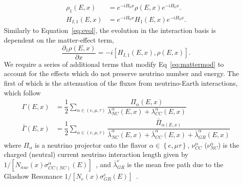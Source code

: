 \documentclass[main.tex]{subfiles}
\begin{document}
\begin{align}
    \rho_{1}(E,x) &= e^{-i H_{0}x}\rho(E,x) e^{-iH_{0}x}. \\
    H_{I,1}(E,x)&= e^{-i H_{0}x} H_{1}(E,x) e^{-iH_{0}x}.
\end{align}
Similarly to Equation~\eqref{eq:evol}, the evolution in the interaction basis is dependent on the matter-effect term,
\begin{equation}\label{eq:mattermod}
    \dfrac{\partial_{1}\rho (E,x)}{\partial x} = -i\left[ H_{I,1}(E,x), \rho(E,x)\right].
\end{equation}
We require a series of additional terms that modify Eq~\eqref{eq:mattermod} to account for the effects which do not preserve neutrino number and energy. 
The first of which is the attenuation of the fluxes from neutrino-Earth interactions, which follow 
\begin{align}\label{eq:nu_evol}
    \Gamma(E,x) &= \dfrac{1}{2}\sum\limits_{\alpha\in(e,\mu,\tau)} \dfrac{\Pi_{\alpha}(E,x) }{\lambda_{NC}^{\alpha}(E,x) + \lambda_{CC}^{\alpha} (E,x)} \\
    \bar{\Gamma}(E,x) &= \dfrac{1}{2}\sum_{\alpha\in(e,\mu,\tau)} \dfrac{\bar{\Pi}_{\alpha(E,x)}}{\bar{\lambda}_{NC}^{\alpha}(E,x) + \bar{\lambda}_{CC}^{\alpha}(E,x) + \bar{\lambda}_{GR}^{\alpha}(E,x) }\label{eq:nubar_evol}
\end{align}
where $\Pi_{\alpha}$ is a neutrino projector onto the flavor $\alpha\in\left\lbrace e,\mu\tau\right\rbrace$, $\nu_{CC}^{\alpha}$ ($\nu_{NC}^{\alpha}$) is the charged (neutral) current neutrino interaction length given by $1/\left[ N_{nuc}(x)\sigma^{\alpha}_{CC(NC)}(E) \right]$~\cite{Formaggio:2013kya, Gandhi:1995tf, Beacom:2019pzs, Zhou:2019vxt, Cooper_Sarkar_2011}, and $\bar{\lambda}_{GR}^{e}$ is the mean free path due to the Glashow Resonance $1/\left[ N_{e}(x)\sigma^{e}_{GR}(E) \right]$~\cite{PhysRev.118.316}. 
\end{document}
